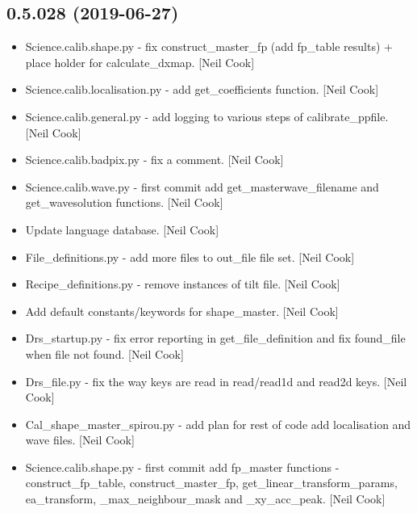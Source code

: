 \documentclass[a4paper,10pt,english]{report}
\begin{document}
\subsection{0.5.028 (2019-06-27)}
\label{\detokenize{misc/changelog:id107}}\begin{itemize}
\item {} 
Science.calib.shape.py - fix construct\_master\_fp (add fp\_table
results) + place holder for calculate\_dxmap. {[}Neil Cook{]}

\item {} 
Science.calib.localisation.py - add get\_coefficients function. {[}Neil
Cook{]}

\item {} 
Science.calib.general.py - add logging to various steps of
calibrate\_ppfile. {[}Neil Cook{]}

\item {} 
Science.calib.badpix.py - fix a comment. {[}Neil Cook{]}

\item {} 
Science.calib.wave.py - first commit add get\_masterwave\_filename and
get\_wavesolution functions. {[}Neil Cook{]}

\item {} 
Update language database. {[}Neil Cook{]}

\item {} 
File\_definitions.py - add more files to out\_file file set. {[}Neil Cook{]}

\item {} 
Recipe\_definitions.py - remove instances of tilt file. {[}Neil Cook{]}

\item {} 
Add default constants/keywords for shape\_master. {[}Neil Cook{]}

\item {} 
Drs\_startup.py - fix error reporting in get\_file\_definition and fix
found\_file when file not found. {[}Neil Cook{]}

\item {} 
Drs\_file.py - fix the way keys are read in read/read1d and read2d
keys. {[}Neil Cook{]}

\item {} 
Cal\_shape\_master\_spirou.py - add plan for rest of code add
localisation and wave files. {[}Neil Cook{]}

\item {} 
Science.calib.shape.py - first commit add fp\_master functions -
construct\_fp\_table, construct\_master\_fp, get\_linear\_transform\_params,
ea\_transform, \_max\_neighbour\_mask and \_xy\_acc\_peak. {[}Neil Cook{]}


\end{itemize}
\end{document}
